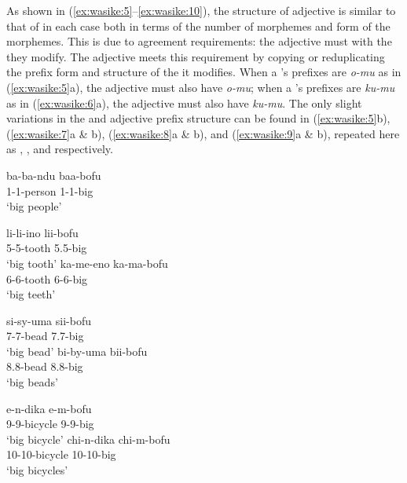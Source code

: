 \documentclass[output=paper,
modfonts
]{langscibook}
\begin{document}
As shown in (\ref{ex:wasike:5}--\ref{ex:wasike:10}), the structure of adjective is similar to that of  in each case both in terms of the number of morphemes and form of the morphemes. This is due to agreement requirements: the adjective must  with the  they modify. The adjective meets this requirement by copying or reduplicating the prefix form and structure of the  it modifies. When a ’s prefixes are \textit{o-mu} as in (\ref{ex:wasike:5}a), the adjective must also have \textit{o-mu}; when a ’s prefixes are \textit{ku-mu} as in (\ref{ex:wasike:6}a), the adjective must also have \textit{ku-mu}. The only slight variations in the  and adjective prefix structure can be found in (\ref{ex:wasike:5}b), (\ref{ex:wasike:7}a \& b), (\ref{ex:wasike:8}a \& b), and (\ref{ex:wasike:9}a \& b), repeated here as , ,  and  respectively.

\ea\label{ex:wasike:11}
\gll ba-ba-ndu baa-bofu\\
     1-1-person 1-1-big\\
\glt ‘big people’
\z

\ea\label{ex:wasike:12}
\ea
\gll li-li-ino lii-bofu\\
     5-5-tooth 5.5-big\\
\glt ‘big tooth’
\ex
\gll  ka-me-eno ka-ma-bofu\\
     6-6-tooth 6-6-big\\
\glt ‘big teeth’
\z
\z


\ea\label{ex:wasike:13}
\ea
\gll si-sy-uma sii-bofu\\
     7-7-bead 7.7-big\\
\glt ‘big bead’
\ex
\gll  bi-by-uma bii-bofu\\
     8.8-bead 8.8-big\\
\glt ‘big beads’
\z
\z

\ea\label{ex:wasike:14}
\ea
\gll e-n-dika e-m-bofu\\
     9-9-bicycle 9-9-big\\
\glt ‘big bicycle’
\ex
\gll  chi-n-dika chi-m-bofu\\
     10-10-bicycle 10-10-big\\
\glt ‘big bicycles’
\z
\z
\end{document}
